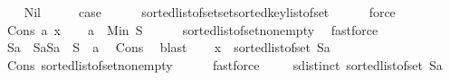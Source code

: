 \begin{isabellebody}
\ \ \isamarkupfalse%
\ Nil\isanewline
\ \ \isamarkupfalse%
\ \isamarkupfalse%
\ {\isacharquery}{\kern0pt}case\isanewline
\ \ \ \ \isamarkupfalse%
\ sorted{\isacharunderscore}{\kern0pt}list{\isacharunderscore}{\kern0pt}of{\isacharunderscore}{\kern0pt}set{\isachardot}{\kern0pt}set{\isacharunderscore}{\kern0pt}sorted{\isacharunderscore}{\kern0pt}key{\isacharunderscore}{\kern0pt}list{\isacharunderscore}{\kern0pt}of{\isacharunderscore}{\kern0pt}set\isanewline
\ \ \ \ \isamarkupfalse%
\ force\isanewline
{}\isamarkupfalse%
\isanewline
\ \ \isamarkupfalse%
\ {\isacharparenleft}{\kern0pt}Cons\ a\ x{\isacharparenright}{\kern0pt}\isanewline
\ \ \isamarkupfalse%
\ {}{\isacharcolon}{\kern0pt}{\isachardoublequoteopen}a\ {\isacharequal}{\kern0pt}\ Min\ S{}{\isachardoublequoteclose}\isanewline
\ \ \ \ \isamarkupfalse%
\ sorted{\isacharunderscore}{\kern0pt}list{\isacharunderscore}{\kern0pt}of{\isacharunderscore}{\kern0pt}set{\isacharunderscore}{\kern0pt}nonempty\ \isamarkupfalse%
\ fastforce\isanewline
\isanewline
\ \ \isamarkupfalse%
\ S{}a\ \ S{}a{\isacharcolon}{\kern0pt}{\isachardoublequoteopen}S{}a\ {\isacharequal}{\kern0pt}\ S{}\ {\isacharminus}{\kern0pt}\ {\isacharbraceleft}{\kern0pt}a{\isacharbraceright}{\kern0pt}{\isachardoublequoteclose}\ \isamarkupfalse%
\ Cons{\isacharparenleft}{\kern0pt}{}{\isacharparenright}{\kern0pt}\ \isamarkupfalse%
\ blast\isanewline
\ \ \isamarkupfalse%
\ {}{\isacharcolon}{\kern0pt}{\isachardoublequoteopen}x\ {\isacharequal}{\kern0pt}\ sorted{\isacharunderscore}{\kern0pt}list{\isacharunderscore}{\kern0pt}of{\isacharunderscore}{\kern0pt}set\ S{}a{\isachardoublequoteclose}\ \isamarkupfalse%
\ Cons{\isacharparenleft}{\kern0pt}{}{\isacharcomma}{\kern0pt}{}{\isacharparenright}{\kern0pt}\ sorted{\isacharunderscore}{\kern0pt}list{\isacharunderscore}{\kern0pt}of{\isacharunderscore}{\kern0pt}set{\isacharunderscore}{\kern0pt}nonempty\isanewline
\ \ \ \ \isamarkupfalse%
\ fastforce\isanewline
\isanewline
\ \ \isamarkupfalse%
\ {}{\isacharcolon}{\kern0pt}\ {\isachardoublequoteopen}sdistinct\ {\isacharparenleft}{\kern0pt}sorted{\isacharunderscore}{\kern0pt}list{\isacharunderscore}{\kern0pt}of{\isacharunderscore}{\kern0pt}set\ S{}a{\isacharparenright}{\kern0pt}{\isachardoublequoteclose}\ \isamarkupfalse%

\end{isabellebody}
